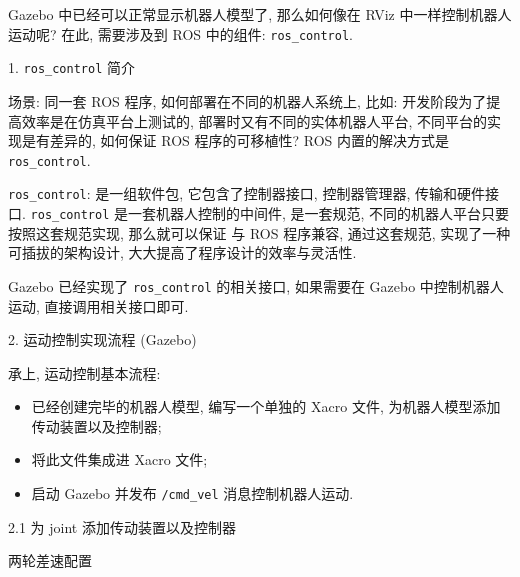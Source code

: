 \documentclass[openany, fontset=windowsold]{ctexbook}
\theoremstyle{kaiti}
\theoremstyle{normal}
\begin{document}
Gazebo 中已经可以正常显示机器人模型了, 那么如何像在 RViz 中一样控制机器人运动呢? 在此, 需要涉及到 ROS 中的组件: \verb|ros_control|.

1. \verb|ros_control| 简介

场景: 同一套 ROS 程序, 如何部署在不同的机器人系统上, 比如: 开发阶段为了提高效率是在仿真平台上测试的, 部署时又有不同的实体机器人平台, 不同平台的实现是有差异的, 如何保证 ROS 程序的可移植性? ROS 内置的解决方式是 \verb|ros_control|.

\verb|ros_control|: 是一组软件包, 它包含了控制器接口, 控制器管理器, 传输和硬件接口. \verb|ros_control| 是一套机器人控制的中间件, 是一套规范, 不同的机器人平台只要按照这套规范实现, 那么就可以保证 与 ROS 程序兼容, 通过这套规范, 实现了一种可插拔的架构设计, 大大提高了程序设计的效率与灵活性.

Gazebo 已经实现了 \verb|ros_control| 的相关接口, 如果需要在 Gazebo 中控制机器人运动, 直接调用相关接口即可.

2. 运动控制实现流程 (Gazebo)

承上, 运动控制基本流程:

\begin{itemize}
  \item 已经创建完毕的机器人模型, 编写一个单独的 Xacro 文件, 为机器人模型添加传动装置以及控制器;
  \item 将此文件集成进 Xacro 文件;
  \item 启动 Gazebo 并发布 \verb|/cmd_vel| 消息控制机器人运动.
\end{itemize}

2.1 为 joint 添加传动装置以及控制器

两轮差速配置
\end{document}
